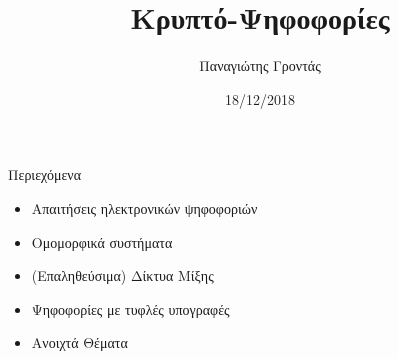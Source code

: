 \documentclass[handout]{beamer}
\title{Κρυπτό-Ψηφοφορίες}
\author{Παναγιώτης Γροντάς}
\date{18/12/2018}
\institute{ΕΜΠ - Κρυπτογραφία (2018-2019)}
\begin{document}
\newcommand{\xor}{\oplus }
\newcommand{\MSG}{\mathtt{M}}
\newcommand{\KEY}{\mathtt{K}}
\newcommand{\CPH}{\mathtt{C}}
\newcommand{\keygen}{\mathtt{KeyGen}}
\newcommand{\enc}{\mathtt{Enc}}
\newcommand{\dec}{\mathtt{Dec}}
\newcommand{\adv}{$\mathcal{A} $ }
\newcommand{\advb}{$\mathcal{B} $ }
\newcommand{\chal}{$\mathcal{C} $ }
\newcommand{\cs}{$\mathcal{CS} $ }
\newcommand{\zns}{\mathbb{Z}^*_n }
\newcommand{\zs}[1]{\mathbb{Z}^*_{#1} }

\newcommand{\green}[1]{\textcolor{teal}{#1}}
\newcommand{\Green}[1]{\textcolor{Teal}{#1}}
\newcommand{\ForestGreen}[1]{\textcolor{ForestGreen}{#1}}
\newcommand{\blue}[1]{\textcolor{blue}{#1}}
\newcommand{\magenta}[1]{\textcolor{magenta}{#1}}
\newcommand{\cyan}[1]{\textcolor{cyan}{#1}}

\newcommand{\twopartdef}[4]
{ 
		\begin{cases}
			#1 , #2 \\
			#3 , #4
		\end{cases} 
}
\begin{frame}
\titlepage
\end{frame}


\npthousandsep{ }

\begin{frame}{Περιεχόμενα}
    \begin{itemize}
        \item Απαιτήσεις ηλεκτρονικών ψηφοφοριών
        \item Ομομορφικά συστήματα 
        \item (Επαληθεύσιμα) Δίκτυα Μίξης 
        \item Ψηφοφορίες με τυφλές υπογραφές 
        \item Ανοιχτά Θέματα 
    \end{itemize}
\end{frame}
\end{document}
